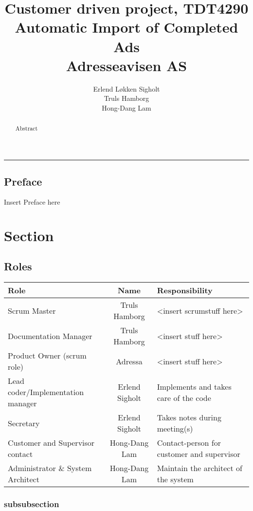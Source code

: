 \documentclass[12pt, a4paper]{article}
\title{\normalsize Customer driven project, TDT4290 \\ \LARGE \textbf{Automatic Import of Completed Ads} \normalsize \\Adresseavisen AS}
\author{Erlend Løkken Sigholt \\ Truls Hamborg \\ Hong-Dang Lam}
\begin{document}
\maketitle
\newpage
\begin{abstract}
 
Abstract
 
\end{abstract}
 
\newpage
\hrule
\subsection*{Preface}
Insert Preface here
\newpage
\tableofcontents
\newpage
 
\section{Section}
\subsection{Roles}
\begin{center}
  \begin{tabular}{| l  c  b{5cm}|}
    \hline
    Role & Name & Responsibility \\ \hline \hline
    Scrum Master & Truls Hamborg &  <insert scrumstuff here>\\ \hline
    Documentation Manager & Truls Hamborg &  <insert stuff here>\\ \hline
    Product Owner (scrum role) & Adressa & <insert stuff here>\\ \hline
    Lead coder/Implementation manager & Erlend Sigholt & Implements and takes care of the code \\ \hline
    Secretary & Erlend Sigholt & Takes notes during meeting(s) \\ \hline
    Customer and Supervisor contact & Hong-Dang Lam & Contact-person for customer and supervisor \\ \hline
    Administrator \& System Architect & Hong-Dang Lam & Maintain the architect of the system \\
    \hline
  \end{tabular}
\end{center}
\subsubsection{subsubsection}
 
\end{document}
